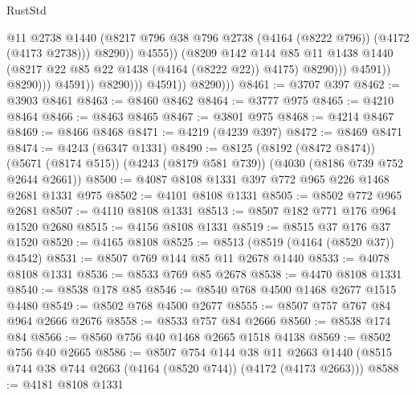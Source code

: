 \begin{lexlean}{RustStd}
\begin{coremodule}
                                              @11
                                              @2738
                                              @1440
                                              (@8217
                                                @796
                                                @38
                                                @796
                                                @2738
                                                (@4164 (@8222 @796))
                                                (@4172 (@4173 @2738)))
                                              @8290))
                                          @4555))
                                      (@8209
                                        @142
                                        @144
                                        @85
                                        @11
                                        @1438
                                        @1440
                                        (@8217 @22 @85 @22 @1438 (@4164 (@8222 @22)) @4175)
                                        @8290)))
                                  @4591))
                              @8290)))
                        @4591))
                    @8290)))
              @4591))
          @8290)))
@8461 := @3707 @397
@8462 := @3903 @8461
@8463 := @8460 @8462
@8464 := @3777 @975
@8465 := @4210 @8464
@8466 := @8463 @8465
@8467 := @3801 @975
@8468 := @4214 @8467
@8469 := @8466 @8468
@8471 := @4219 (@4239 @397)
@8472 := @8469 @8471
@8474 := @4243 (@6347 @1331)
@8490 := @8125
    (@8192 (@8472 @8474))
    (@5671 (@8174 @515))
    (@4243 (@8179 @581 @739))
    (@4030 (@8186 @739 @752 @2644 @2661))
@8500 := @4087 @8108 @1331 @397 @772 @965 @226 @1468 @2681 @1331 @975
@8502 := @4101 @8108 @1331
@8505 := @8502 @772 @965 @2681
@8507 := @4110 @8108 @1331
@8513 := @8507 @182 @771 @176 @964 @1520 @2680
@8515 := @4156 @8108 @1331
@8519 := @8515 @37 @176 @37 @1520
@8520 := @4165 @8108
@8525 := @8513 (@8519 (@4164 (@8520 @37)) @4542)
@8531 := @8507 @769 @144 @85 @11 @2678 @1440
@8533 := @4078 @8108 @1331
@8536 := @8533 @769 @85 @2678
@8538 := @4470 @8108 @1331
@8540 := @8538 @178 @85
@8546 := @8540 @768 @4500 @1468 @2677 @1515 @4480
@8549 := @8502 @768 @4500 @2677
@8555 := @8507 @757 @767 @84 @964 @2666 @2676
@8558 := @8533 @757 @84 @2666
@8560 := @8538 @174 @84
@8566 := @8560 @756 @40 @1468 @2665 @1518 @4138
@8569 := @8502 @756 @40 @2665
@8586 := @8507
    @754
    @144
    @38
    @11
    @2663
    @1440
    (@8515 @744 @38 @744 @2663 (@4164 (@8520 @744)) (@4172 (@4173 @2663)))
@8588 := @4181 @8108 @1331

\end{coremodule}
\end{lexlean}
